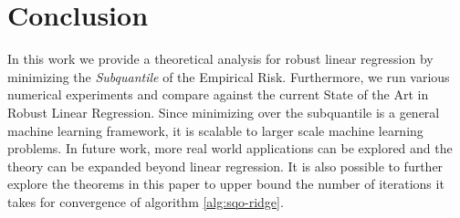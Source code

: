 \documentclass{article} %
\begin{document}
	\section{Conclusion}
	In this work we provide a theoretical analysis for robust linear regression by minimizing the \textit{Subquantile} of the Empirical Risk. Furthermore, we run various numerical experiments and compare against the current State of the Art in Robust Linear Regression. Since minimizing over the subquantile is a general machine learning framework, it is scalable to larger scale machine learning problems. In future work, more real world applications can be explored and the theory can be expanded beyond linear regression. It is also possible to further explore the theorems in this paper to upper bound the number of iterations it takes for convergence of algorithm \ref{alg:sqo-ridge}.
	
	\newpage

	
	
	
\end{document}
